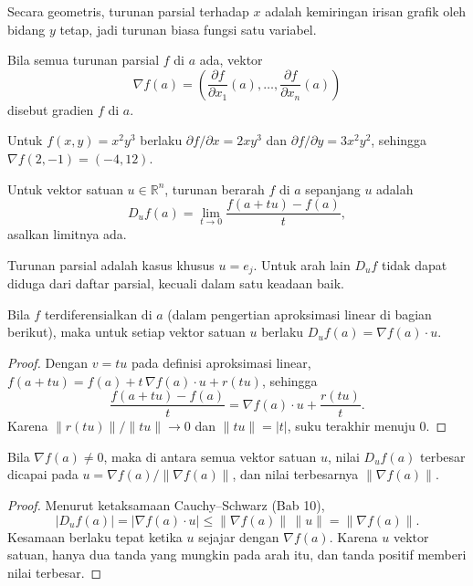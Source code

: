 Secara geometris, turunan parsial terhadap $x$ adalah kemiringan irisan grafik oleh bidang
$y$ tetap, jadi turunan biasa fungsi satu variabel.


\begin{definisi}[Gradien]
Bila semua turunan parsial $f$ di $a$ ada, vektor
\[
  \nabla f(a)=\left(\frac{\partial f}{\partial x_{1}}(a),\dots,
  \frac{\partial f}{\partial x_{n}}(a)\right)
\]
disebut gradien $f$ di $a$.
\end{definisi}

Untuk $f(x,y)=x^{2}y^{3}$ berlaku $\partial f/\partial x=2xy^{3}$ dan
$\partial f/\partial y=3x^{2}y^{2}$, sehingga $\nabla f(2,-1)=(-4,12)$.

\begin{definisi}
Untuk vektor satuan $u\in\mathbb{R}^{n}$, turunan berarah $f$ di $a$ sepanjang $u$ adalah
\[
  D_{u}f(a)=\lim_{t\to0}\frac{f(a+tu)-f(a)}{t},
\]
asalkan limitnya ada.
\end{definisi}

Turunan parsial adalah kasus khusus $u=e_{j}$. Untuk arah lain $D_{u}f$ tidak dapat diduga
dari daftar parsial, kecuali dalam satu keadaan baik.

\begin{proposisi}
Bila $f$ terdiferensialkan di $a$ (dalam pengertian aproksimasi linear di bagian berikut),
maka untuk setiap vektor satuan $u$ berlaku $D_{u}f(a)=\nabla f(a)\cdot u$.
\end{proposisi}

\begin{proof}
Dengan $v=tu$ pada definisi aproksimasi linear,
$f(a+tu)=f(a)+t\,\nabla f(a)\cdot u+r(tu)$, sehingga
\[
  \frac{f(a+tu)-f(a)}{t}=\nabla f(a)\cdot u+\frac{r(tu)}{t}.
\]
Karena $\|r(tu)\|/\|tu\|\to0$ dan $\|tu\|=|t|$, suku terakhir menuju $0$.
\end{proof}

\begin{proposisi}
Bila $\nabla f(a)\neq0$, maka di antara semua vektor satuan $u$, nilai $D_{u}f(a)$ terbesar
dicapai pada $u=\nabla f(a)/\|\nabla f(a)\|$, dan nilai terbesarnya $\|\nabla f(a)\|$.
\end{proposisi}

\begin{proof}
Menurut ketaksamaan Cauchy--Schwarz (Bab 10),
\[
  |D_{u}f(a)|=|\nabla f(a)\cdot u|\le\|\nabla f(a)\|\,\|u\|=\|\nabla f(a)\|.
\]
Kesamaan berlaku tepat ketika $u$ sejajar dengan $\nabla f(a)$. Karena $u$ vektor satuan,
hanya dua tanda yang mungkin pada arah itu, dan tanda positif memberi nilai terbesar.
\end{proof}

